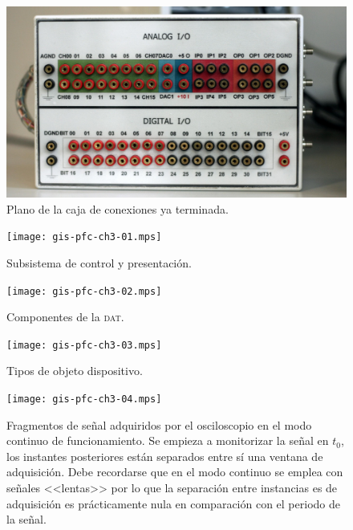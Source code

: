 \documentclass[a4paper,12pt]				{article}
\begin{document}
\begin{figure}
	\begin{center}
		\includegraphics[scale=1, keepaspectratio=true]
		{gis-pfc-ch2-05.jpg}
	\end{center}
	\caption[Plano de la caja de conexiones ya terminada]{Plano de la
	caja de conexiones ya terminada.}
	\label{fig:conbox}
\end{figure}

\clearpage

\begin{figure}
	\begin{center}
		\texttt{[image: gis-pfc-ch3-01.mps]}
	\end{center}
	\caption[Subsistema de control y presentación]{Subsistema de
	control y presentación.}
	\label{sub:control}
\end{figure}

\begin{figure}
	\begin{center}
		\texttt{[image: gis-pfc-ch3-02.mps]}
	\end{center}
	\caption[Componentes de la \textsc{dat}]{Componentes de la
	\textsc{dat}.}
	\label{fig:dat}
\end{figure}

\begin{figure}
	\begin{center}
		\texttt{[image: gis-pfc-ch3-03.mps]}
	\end{center}
	\caption[Tipos de objeto dispositivo]{Tipos de objeto dispositivo.}
	\label{fig:devobject}
\end{figure}

\begin{figure}
	\begin{center}
		\texttt{[image: gis-pfc-ch3-04.mps]}
	\end{center}
	\caption[Fragmentos de señal ordenados según llegan al
	osciloscopio]{Fragmentos de señal adquiridos por el osciloscopio en
	el modo continuo de funcionamiento. Se empieza a monitorizar la
	señal en $t_0$, los instantes posteriores están separados entre sí
	una ventana de adquisición. Debe recordarse que en el modo continuo
	se emplea con señales <<lentas>> por lo que la separación entre
	instancias es de adquisición es prácticamente nula en comparación
	con el periodo de la señal.}
	\label{fig:freesignalcont}
\end{figure}
\end{document}
